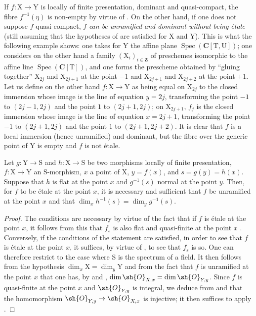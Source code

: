 \begin{remark}[18.10.3.1]
\label{IV.18.10.3.1}
If $f:\mathrm{X}\to\mathrm{Y}$ is locally of finite presentation, dominant and quasi-compact, the fibre $f^{-1}(\eta)$ is non-empty by virtue of .
On the other hand, if one does not suppose $f$ quasi-compact, $f$ \emph{can be unramified and dominant without being \'etale} (still assuming that the hypotheses of  are satisfied for $\mathrm{X}$ and $\mathrm{Y}$).
This is what the following example shows: one takes for $\mathrm{Y}$ the affine plane $\operatorname{Spec}(\mathbf{C}[\mathrm{T},\mathrm{U}])$; one considers on the other hand a family $(\mathrm{X}_i)_{i\in\mathbf{Z}}$ of preschemes isomorphic to the affine line $\operatorname{Spec}(\mathbf{C}[\mathrm{T}])$, and one forms the prescheme obtained by ``gluing together'' $\mathrm{X}_{2j}$ and $\mathrm{X}_{2j+1}$ at the point $-1$ and $\mathrm{X}_{2j+1}$ and $\mathrm{X}_{2j+2}$ at the point $+1$.
Let us define on the other hand $f:\mathrm{X}\to\mathrm{Y}$ as being equal on $\mathrm{X}_{2j}$ to the closed immersion whose image is the line of equation $y=2j$, transforming the point $-1$ to $(2j-1,2j)$ and the point $1$ to $(2j+1,2j)$; on $\mathrm{X}_{2j+1}$, $f_j$ is the closed immersion whose image is the line of equation $x=2j+1$, transforming the point $-1$ to $(2j+1,2j)$ and the point $1$ to $(2j+1,2j+2)$.
It is clear that $f$ is a local immersion (hence unramified) and dominant, but the fibre over the generic point of $\mathrm{Y}$ is empty and $f$ is not \'etale.
\end{remark}

\begin{corollary}[18.10.4]
\label{IV.18.10.4}
Let $g:\mathrm{Y}\to\mathrm{S}$ and $h:\mathrm{X}\to\mathrm{S}$ be two morphisms locally of finite presentation, $f:\mathrm{X}\to\mathrm{Y}$ an $\mathrm{S}$-morphism, $x$ a point of $\mathrm{X}$, $y=f(x)$, and $s=g(y)=h(x)$.
Suppose that $h$ is flat at the point $x$ and $g^{-1}(s)$ normal at the point $y$.
Then, for $f$ to be \'etale at the point $x$, it is necessary and sufficient that $f$ be unramified at the point $x$ and that $\dim_xh^{-1}(s)=\dim_yg^{-1}(s)$.
\end{corollary}

\begin{proof}
The conditions are necessary by virtue of the fact that if $f$ is \'etale at the point $x$, it follows from this that $f_s$ is also flat and quasi-finite at the point $x$ .
Conversely, if the conditions of the statement are satisfied, in order to see that $f$ is \'etale at the point $x$, it suffices, by virtue of , to see that $f_s$ is so.
One can therefore restrict to the case where $\mathrm{S}$ is the spectrum of a field.
It then follows from the hypothesis $\dim_x\mathrm{X}=\dim_y\mathrm{Y}$ and from the fact that $f$ is unramified at the point $x$ that one has, by  and , $\dim\sh{O}_{X,x}=\dim\sh{O}_{Y,y}$. Since $f$ is quasi-finite at the point $x$ and $\sh{O}_{Y,y}$ is integral, we deduce from  and  that the homomorphism $\sh{O}_{Y,y}\to\sh{O}_{X,x}$ is injective; it then suffices to apply .
\end{proof}

